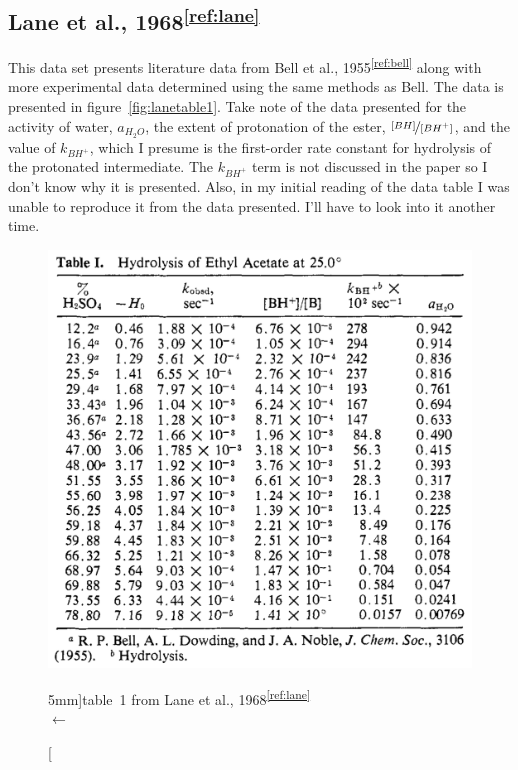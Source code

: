 \documentclass[]{tufte-handout}
\newcommand{\tss}[1]{\textsuperscript{#1}}
\begin{document}
\subsection{Lane et al., 1968\tss{\ref{ref:lane}}}

This data set presents literature data from Bell et al., 1955\tss{\ref{ref:bell}} along with more experimental data determined using the same methods as Bell. The data is presented in figure~\vref{fig:lanetable1}. Take note of the data presented for the activity of water, $a_{H_2O}$, the extent of protonation of the ester, $\nicefrac{[BH]}{[BH^+]}$, and the value of $k_{BH^+}$, which I presume is the first-order rate constant for hydrolysis of the protonated intermediate. The $k_{BH^+}$ term is not discussed in the paper so I don't know why it is presented. Also, in my initial reading of the data table I was unable to reproduce it from the data presented. I'll have to look into it another time.

\begin{figure}[h!]
\vspace{0mm}
  \centering
  \includegraphics[scale=0.2]{images/LaneTable1}
  \caption[][5mm]{table~1 from Lane et al., 1968\tss{\ref{ref:lane}}   \\  $\longleftarrow$ \vspace{3mm}}
  \label{fig:lanetable1}
\end{figure}
\end{document}
